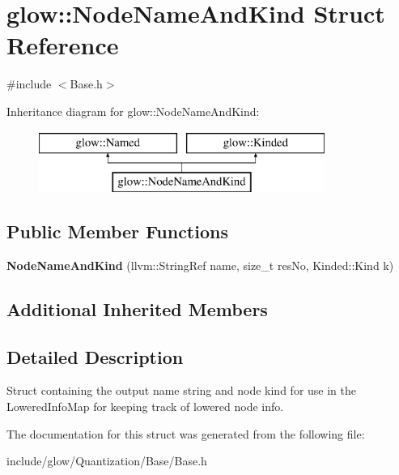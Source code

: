 \hypertarget{structglow_1_1_node_name_and_kind}{}\section{glow\+:\+:Node\+Name\+And\+Kind Struct Reference}
\label{structglow_1_1_node_name_and_kind}


{\ttfamily \#include $<$Base.\+h$>$}

Inheritance diagram for glow\+:\+:Node\+Name\+And\+Kind\+:\begin{figure}[H]
\begin{center}
\leavevmode
\includegraphics[height=2.000000cm]{structglow_1_1_node_name_and_kind}
\end{center}
\end{figure}
\subsection*{Public Member Functions}
\begin{DoxyCompactItemize}
\item 
\mbox{\label{structglow_1_1_node_name_and_kind_a73df616e38ab0a4f165d39e142522b80}} 
{\bfseries Node\+Name\+And\+Kind} (llvm\+::\+String\+Ref name, size\+\_\+t res\+No, Kinded\+::\+Kind k)
\end{DoxyCompactItemize}
\subsection*{Additional Inherited Members}


\subsection{Detailed Description}
Struct containing the output name string and node kind for use in the Lowered\+Info\+Map for keeping track of lowered node info. 

The documentation for this struct was generated from the following file\+:\begin{DoxyCompactItemize}
\item 
include/glow/\+Quantization/\+Base/Base.\+h\end{DoxyCompactItemize}
